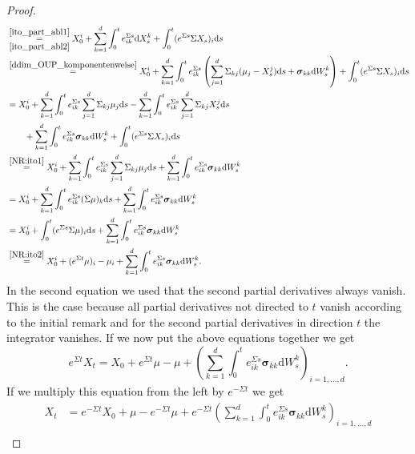 \documentclass[11pt,titlepage]{article}
\theoremstyle{definition}
\theoremstyle{remark}
\begin{document}
\begin{proof}
\begin{align*}
			&\overset{\ref{ito_part_abl1}}{\underset{\ref{ito_part_abl2}}{=}} X_0^i +\sum_{k=1}^d \int_0^t 
			e^{\Sigma s}_{ik}\mathrm{d}X^k_s +\int_0^t (e^{\Sigma s}\Sigma X_s)_i\mathrm{d}s\\
			&\overset{\ref{ddim_OUP_komponentenweise}}{=}X_0^i +\sum_{k=1}^d \int_0^t 
			e^{\Sigma s}_{ik}\left(\sum_{j=1}^d \Sigma_{kj}(\mu_j-X_s^j)\mathrm{d}s+\boldsymbol{\sigma}_{kk} \mathrm{d}W_s^k\right) +\int_0^t (e^{\Sigma s}\Sigma X_s)_i\mathrm{d}s\\
			&=X_0^i +\sum_{k=1}^d \int_0^t 
			e^{\Sigma s}_{ik}\sum_{j=1}^d \Sigma_{kj}\mu_j\mathrm{d}s -\sum_{k=1}^d \int_0^t 
			e^{\Sigma s}_{ik}\sum_{j=1}^d \Sigma_{kj}X_s^j\mathrm{d}s\\
			&\qquad+\sum_{k=1}^d \int_0^t 
			e^{\Sigma s}_{ik}\boldsymbol{\sigma}_{kk} \mathrm{d}W_s^k +\int_0^t (e^{\Sigma s}\Sigma X_s)_i\mathrm{d}s\\
			&\overset{\ref{NR:ito1}}{=}X_0^i +\sum_{k=1}^d \int_0^t 
			e^{\Sigma s}_{ik}\sum_{j=1}^d \Sigma_{kj}\mu_j\mathrm{d}s+\sum_{k=1}^d \int_0^t 
			e^{\Sigma s}_{ik}\boldsymbol{\sigma}_{kk} \mathrm{d}W_s^k\\
			&=X_0^i +\sum_{k=1}^d \int_0^t 
			e^{\Sigma s}_{ik} (\Sigma\mu)_k\mathrm{d}s+\sum_{k=1}^d \int_0^t 
			e^{\Sigma s}_{ik}\boldsymbol{\sigma}_{kk} \mathrm{d}W_s^k\\
			&=X_0^i + \int_0^t 
			(e^{\Sigma s}\Sigma\mu)_i\mathrm{d}s+\sum_{k=1}^d \int_0^t 
			e^{\Sigma s}_{ik}\boldsymbol{\sigma}_{kk} \mathrm{d}W_s^k\\
			&\overset{\ref{NR:ito2}}{=}X_0^i + (e^{\Sigma t}\mu)_i -\mu_i+\sum_{k=1}^d \int_0^t 
			e^{\Sigma s}_{ik}\boldsymbol{\sigma}_{kk} \mathrm{d}W_s^k.
		\end{align*}
		In the second equation we used that the second partial derivatives always vanish. This is the case because all partial derivatives not directed to $t$ vanish according to the initial remark and for the second partial derivatives in direction $t$ the integrator vanishes. 
		If we now put the above equations together we get 
		\[e^{\Sigma t}X_t=X_0+e^{\Sigma t}\mu-\mu +\left(\sum_{k=1}^d\int_0^t 
		e^{\Sigma s}_{ik}\boldsymbol{\sigma}_{kk}\mathrm{d}W_s^k\right)_{i=1,\ldots,d}.\]
		If we multiply this equation from the left by $e^{-\Sigma t}$ we get
		\begin{align*}
			X_t &= e^{-\Sigma t}X_0 +\mu -e^{-\Sigma t}\mu +e^{-\Sigma t}\left(\sum_{k=1}^d\int_0^t 
			e^{\Sigma s}_{ik}\boldsymbol{\sigma}_{kk}\mathrm{d}W_s^k\right)_{i=1,\ldots,d}\\

\end{align*}
\end{proof}
\end{document}
